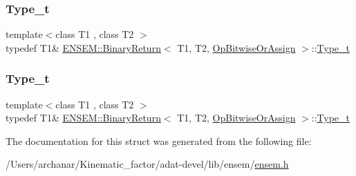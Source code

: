 \mbox{\label{structENSEM_1_1BinaryReturn_3_01T1_00_01T2_00_01OpBitwiseOrAssign_01_4_a26b576167f103506b9c1a03f33944d0f}} 
\subsubsection{\texorpdfstring{Type\_t}{Type\_t}\hspace{0.1cm}{\footnotesize\ttfamily [2/3]}}
{\footnotesize\ttfamily template$<$class T1 , class T2 $>$ \\
typedef T1\& \mbox{\hyperlink{structENSEM_1_1BinaryReturn}{E\+N\+S\+E\+M\+::\+Binary\+Return}}$<$ T1, T2, \mbox{\hyperlink{structENSEM_1_1OpBitwiseOrAssign}{Op\+Bitwise\+Or\+Assign}} $>$\+::\mbox{\hyperlink{structENSEM_1_1BinaryReturn_3_01T1_00_01T2_00_01OpBitwiseOrAssign_01_4_a26b576167f103506b9c1a03f33944d0f}{Type\+\_\+t}}}

\mbox{\label{structENSEM_1_1BinaryReturn_3_01T1_00_01T2_00_01OpBitwiseOrAssign_01_4_a26b576167f103506b9c1a03f33944d0f}} 
\subsubsection{\texorpdfstring{Type\_t}{Type\_t}\hspace{0.1cm}{\footnotesize\ttfamily [3/3]}}
{\footnotesize\ttfamily template$<$class T1 , class T2 $>$ \\
typedef T1\& \mbox{\hyperlink{structENSEM_1_1BinaryReturn}{E\+N\+S\+E\+M\+::\+Binary\+Return}}$<$ T1, T2, \mbox{\hyperlink{structENSEM_1_1OpBitwiseOrAssign}{Op\+Bitwise\+Or\+Assign}} $>$\+::\mbox{\hyperlink{structENSEM_1_1BinaryReturn_3_01T1_00_01T2_00_01OpBitwiseOrAssign_01_4_a26b576167f103506b9c1a03f33944d0f}{Type\+\_\+t}}}



The documentation for this struct was generated from the following file\+:\begin{DoxyCompactItemize}
\item 
/\+Users/archanar/\+Kinematic\+\_\+factor/adat-\/devel/lib/ensem/\mbox{\hyperlink{adat-devel_2lib_2ensem_2ensem_8h}{ensem.\+h}}\end{DoxyCompactItemize}
